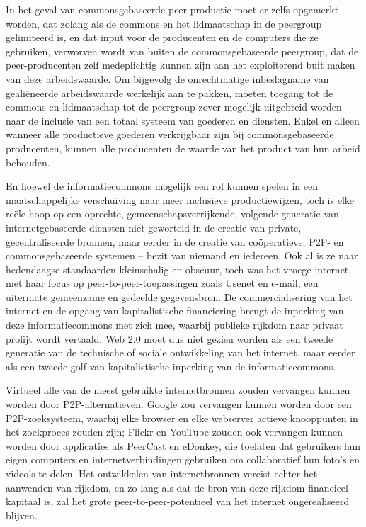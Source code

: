 {In het geval van commonsgebaseerde peer{}-productie moet er zelfs
opgemerkt worden, dat zolang als de commons en het lidmaatschap in de
peergroup gelimiteerd is, en dat input voor de producenten en de
computers die ze gebruiken, verworven wordt van buiten de
commonsgebaseerde peergroup, dat de peer{}-producenten zelf
medeplichtig kunnen zijn aan het exploiterend buit maken van deze
arbeidswaarde. Om bijgevolg de onrechtmatige inbeslagname van
geali\"eneerde arbeidswaarde werkelijk aan te pakken, moeten toegang
tot de commons en lidmaatschap tot de peergroup zover mogelijk
uitgebreid worden naar de inclusie van een totaal systeem van goederen
en diensten. Enkel en alleen wanneer alle productieve goederen
verkrijgbaar zijn bij commonsgebaseerde producenten, kunnen alle
producenten de waarde van het product van hun arbeid behouden.

En hoewel de informatiecommons mogelijk een rol kunnen spelen in een
maatschappelijke verschuiving naar meer inclusieve productiewijzen,
toch is elke re\"ele hoop op een oprechte, gemeenschapsverrijkende,
volgende generatie van internetgebaseerde diensten niet geworteld in de
creatie van private, gecentraliseerde bronnen, maar eerder in de
creatie van co\"operatieve, P2P{}- en commonsgebaseerde systemen {--}
bezit van niemand en iedereen. Ook al is ze naar hedendaagse
standaarden kleinschalig en obscuur, toch was het vroege internet, met
haar focus op peer{}-to{}-peer{}-toepassingen zoals Usenet en e{}-mail,
een uitermate gemeenzame en gedeelde gegevensbron. De commercialisering
van het internet en de opgang van kapitalistische financiering brengt
de inperking van deze informatiecommons met zich mee, waarbij publieke
rijkdom naar privaat profijt wordt vertaald. Web 2.0 moet dus niet
gezien worden als een tweede generatie van de technische of sociale
ontwikkeling van het internet, maar eerder als een tweede golf van
kapitalistische inperking van de informatiecommons. 

Virtueel alle van de meest gebruikte internetbronnen zouden vervangen
kunnen worden door P2P{}-alternatieven. Google zou vervangen kunnen
worden door een P2P{}-zoeksysteem, waarbij elke browser en elke
webserver actieve knooppunten in het zoekproces zouden zijn; Flickr en
YouTube zouden ook vervangen kunnen worden door applicaties als
PeerCast en eDonkey, die toelaten dat gebruikers hun eigen computers en
internetverbindingen gebruiken om collaboratief hun foto's en video's
te delen. Het ontwikkelen van internetbronnen vereist echter het
aanwenden van rijkdom, en zo lang als dat de bron van deze rijkdom
financieel kapitaal is, zal het grote peer{}-to{}-peer{}-potentieel van
het internet ongerealiseerd blijven.}

